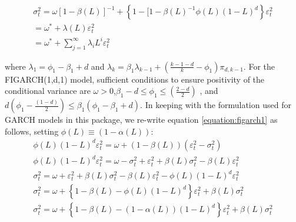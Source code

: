 \begin{equation}\label{equation:figarch1}
\begin{array}{l}
\sigma _t^2 = \omega {\left[ {1 - \beta \left( L \right)} \right]^{ - 1}} + \left\{ {1 - [1 - \beta {{\left( L \right)}^{ - 1}}\phi \left( L \right){{\left( {1 - L} \right)}^d}} \right\}\varepsilon _t^2\\
 = {\omega ^*} + \lambda \left( L \right)\varepsilon _t^2\\
 = {\omega ^*} + \sum\limits_{j = 1}^\infty  {{\lambda _i}{L^i}\varepsilon _t^2}
\end{array}
\end{equation}

where ${\lambda _1} = {\phi _1} - {\beta _1} + d$ and ${\lambda _k} = {\beta _1}{\lambda _{k - 1}} + \left( {\frac{{k - 1 - d}}{k} - {\phi _1}} \right){\pi _{d,k - 1}}$. For the FIGARCH(1,d,1) model, sufficient conditions to ensure positivity of the conditional variance are $\omega  > 0$,${\beta _1} - d \le {\phi _1} \le \left( {\frac{{2 - d}}{2}} \right)$ , and $d\left( {{\phi _1} - \frac{{\left( {1 - d} \right)}}{2}} \right) \le {\beta _1}\left( {{\phi _1} - {\beta _1} + d} \right)$.
In keeping with the formulation used for GARCH models in this package, we re-write equation \ref{equation:figarch1} as follows, setting $\phi \left( L \right) \equiv \left( {1 - \alpha \left( L \right)} \right)$:
\begin{equation}
\begin{array}{l}
\phi \left( L \right){\left( {1 - L} \right)^d}\varepsilon _t^2 = \omega  + \left( {1 - \beta \left( L \right)} \right)\left( {\varepsilon _t^2 - \sigma _t^2} \right)\\
\phi \left( L \right){\left( {1 - L} \right)^d}\varepsilon _t^2 = \omega  - \sigma _t^2 + \varepsilon _t^2 + \beta \left( L \right)\sigma _t^2 - \beta \left( L \right)\varepsilon _t^2\\
\sigma _t^2 = \omega  + \varepsilon _t^2 + \beta \left( L \right)\sigma _t^2 - \beta \left( L \right)\varepsilon _t^2 - \phi \left( L \right){\left( {1 - L} \right)^d}\varepsilon _t^2\\
\sigma _t^2 = \omega  + \left\{ {1 - \beta \left( L \right) - \phi \left( L \right){{\left( {1 - L} \right)}^d}} \right\}\varepsilon _t^2 + \beta \left( L \right)\sigma _t^2\\
\sigma _t^2 = \omega  + \left\{ {1 - \beta \left( L \right) - \left( {1 - \alpha \left( L \right)} \right){{\left( {1 - L} \right)}^d}} \right\}\varepsilon _t^2 + \beta \left( L \right)\sigma _t^2
\end{array}
\end{equation}
